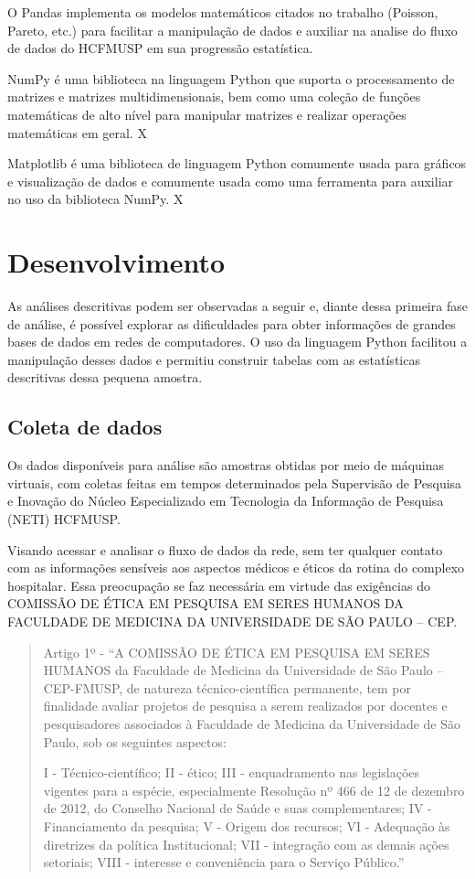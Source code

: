 \documentclass[
	12pt,				%
	openright,			%
	twoside,			%
	a4paper,			%
	english,			%
	french,				%
	spanish,			%
	brazil				%
	]{abntex2}
\begin{document}
O Pandas implementa os modelos matemáticos citados no trabalho (Poisson, Pareto, etc.) para facilitar a manipulação de dados e auxiliar na analise do fluxo de dados do HCFMUSP em sua progressão estatística.

NumPy é uma biblioteca na linguagem Python que suporta o processamento de matrizes e matrizes multidimensionais, bem como uma coleção de funções matemáticas de alto nível para manipular matrizes e realizar operações matemáticas em geral. X

Matplotlib é uma biblioteca de linguagem Python comumente usada para gráficos e visualização de dados e comumente usada como uma ferramenta para auxiliar no uso da biblioteca NumPy. X


\chapter{Desenvolvimento}

As análises descritivas podem ser observadas a seguir e, diante dessa primeira fase de análise, é possível explorar as dificuldades para obter informações de grandes bases de dados em redes de computadores. O uso da linguagem Python facilitou a manipulação desses dados e permitiu construir tabelas com as estatísticas descritivas dessa pequena amostra.

\section{Coleta de dados}

Os dados disponíveis para análise são amostras obtidas por meio de máquinas virtuais, com coletas feitas em tempos determinados pela Supervisão de Pesquisa e Inovação do Núcleo Especializado em Tecnologia da Informação de Pesquisa (NETI) HCFMUSP.

Visando acessar e analisar o fluxo de dados da rede, sem ter qualquer contato com as informações sensíveis aos aspectos médicos e éticos da rotina do complexo hospitalar. Essa preocupação se faz necessária em virtude das exigências do COMISSÃO DE ÉTICA EM PESQUISA EM SERES HUMANOS DA FACULDADE DE MEDICINA DA UNIVERSIDADE DE SÃO PAULO – CEP.

\begin{quote}
Artigo 1º - “A COMISSÃO DE ÉTICA EM PESQUISA EM SERES HUMANOS da Faculdade de Medicina da Universidade de São Paulo – CEP-FMUSP, de natureza técnico-científica permanente, tem por finalidade avaliar projetos de pesquisa a serem realizados por docentes e pesquisadores associados à Faculdade de Medicina da Universidade de São Paulo, sob os seguintes aspectos:


I - Técnico-científico;
II - ético;
III - enquadramento nas legislações vigentes para a espécie, especialmente Resolução nº 466 de 12 de dezembro de 2012, do Conselho
Nacional de Saúde e suas complementares;
IV - Financiamento da pesquisa;
V - Origem dos recursos;
VI - Adequação às diretrizes da política Institucional;
VII - integração com as demais ações setoriais;
VIII - interesse e conveniência para o Serviço Público.”
\end{quote}
\end{document}

